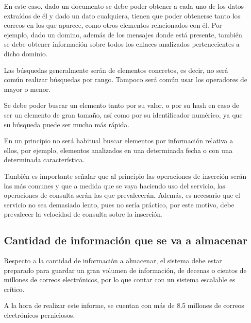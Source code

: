 En este caso, dado un documento se debe poder obtener a cada uno de los datos extraídos de él y dado un dato cualquiera, tienen que poder obtenerse tanto los correos en los que aparece, como otros elementos relacionados con él. Por ejemplo, dado un domino, además de los mensajes donde está presente, también se debe obtener información sobre todos los enlaces analizados pertenecientes a dicho dominio.

Las búsquedas generalmente serán de elementos concretos, es decir, no será común realizar búsquedas por rango. Tampoco será común usar los operadores de mayor o menor.

Se debe poder buscar un elemento tanto por su valor, o por su hash en caso de ser un elemento de gran tamaño, así como por su identificador numérico, ya que su búsqueda puede ser mucho más rápida. 

En un principio no será habitual buscar elementos por información relativa a ellos, por ejemplo, elementos analizados en una determinada fecha o con una determinada característica. 

También es importante señalar que al principio las operaciones de inserción serán las más comunes y que a medida que se vaya haciendo uso del servicio, las operaciones de consulta serán las que prevalecerán. Además, es necesario que el servicio no sea demasiado lento, pues no sería práctico, por este motivo, debe prevalecer la velocidad de consulta sobre la inserción. 

\subsection{Cantidad de información que se va a almacenar}
Respecto a la cantidad de información a almacenar, el sistema debe estar preparado para guardar un gran volumen de información, de decenas o cientos de millones de correos electrónicos, por lo que contar con un sistema escalable es crítico.  

A la hora de realizar este informe, se cuentan con más de 8.5 millones de correos electrónicos perniciosos. 

